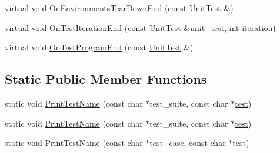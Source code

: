 \begin{DoxyCompactItemize}
\item 
virtual void \mbox{\hyperlink{classtesting_1_1internal_1_1_pretty_unit_test_result_printer_ab23094ef3b714778b2f742d39818c280}{On\+Environments\+Tear\+Down\+End}} (const \mbox{\hyperlink{classtesting_1_1_unit_test}{Unit\+Test}} \&)
\item 
virtual void \mbox{\hyperlink{classtesting_1_1internal_1_1_pretty_unit_test_result_printer_a02ae3a9b477a559edeefe4f7c11134a2}{On\+Test\+Iteration\+End}} (const \mbox{\hyperlink{classtesting_1_1_unit_test}{Unit\+Test}} \&unit\+\_\+test, int iteration)
\item 
virtual void \mbox{\hyperlink{classtesting_1_1internal_1_1_pretty_unit_test_result_printer_a8c92c062889abdb940b04ffe113f5980}{On\+Test\+Program\+End}} (const \mbox{\hyperlink{classtesting_1_1_unit_test}{Unit\+Test}} \&)
\end{DoxyCompactItemize}
\subsection*{Static Public Member Functions}
\begin{DoxyCompactItemize}
\item 
static void \mbox{\hyperlink{classtesting_1_1internal_1_1_pretty_unit_test_result_printer_aba6463878ddb96303f620c62353bbdb5}{Print\+Test\+Name}} (const char $\ast$test\+\_\+suite, const char $\ast$\mbox{\hyperlink{_mutual_8h_a707ee03719e99670bf6cfdfd897b8456}{test}})
\item 
static void \mbox{\hyperlink{classtesting_1_1internal_1_1_pretty_unit_test_result_printer_aba6463878ddb96303f620c62353bbdb5}{Print\+Test\+Name}} (const char $\ast$test\+\_\+suite, const char $\ast$\mbox{\hyperlink{_mutual_8h_a707ee03719e99670bf6cfdfd897b8456}{test}})
\item 
static void \mbox{\hyperlink{classtesting_1_1internal_1_1_pretty_unit_test_result_printer_a5b60a9aed1db02837b11450f6e8d0f71}{Print\+Test\+Name}} (const char $\ast$test\+\_\+case, const char $\ast$\mbox{\hyperlink{_mutual_8h_a707ee03719e99670bf6cfdfd897b8456}{test}})
\end{DoxyCompactItemize}
